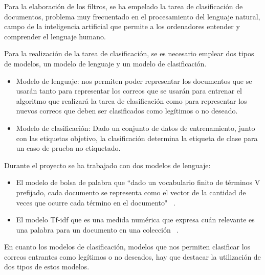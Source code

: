 \documentclass[conference,a4paper]{IEEEtran}
\begin{document}
Para la elaboración de los filtros, se ha empelado la tarea de clasificación de documentos, problema muy frecuentado en el procesamiento del lenguaje natural, campo de la inteligencia artificial que permite a los ordenadores entender y comprender el lenguaje humano.

Para la realización de la tarea de clasificación, se es necesario emplear dos tipos de modelos, un modelo de lenguaje y un modelo de clasificación.



\begin{itemize}
\item Modelo de lenguaje: nos permiten poder representar los documentos que se usarán tanto para representar los correos que se usarán para entrenar el algoritmo que realizará la tarea de clasificación como para representar los nuevos correos que deben ser clasificados como legítimos o no deseado.
\item Modelo de clasificación: Dado un conjunto de datos de entrenamiento, junto con las etiquetas objetivo, la clasificación determina la etiqueta de clase para un caso de prueba no etiquetado.~\cite{b4}
\end{itemize}

Durante el proyecto se ha trabajado con dos modelos de lenguaje:

\begin{itemize}
\item El modelo de bolsa de palabra que ``dado un vocabulario finito de términos V prefijado,
cada documento se representa como el vector de la cantidad de veces que ocurre cada término en el documento" ~\cite{b2}.
\item El modelo Tf-idf que es una medida numérica que expresa cuán relevante es una palabra para un documento en una colección ~\cite{b20}.
\end{itemize}

En cuanto los modelos de clasificación, modelos que nos permiten clasificar los correos entrantes como legítimos o no deseados, hay que destacar la utilización de dos tipos de estos modelos.
\end{document}
